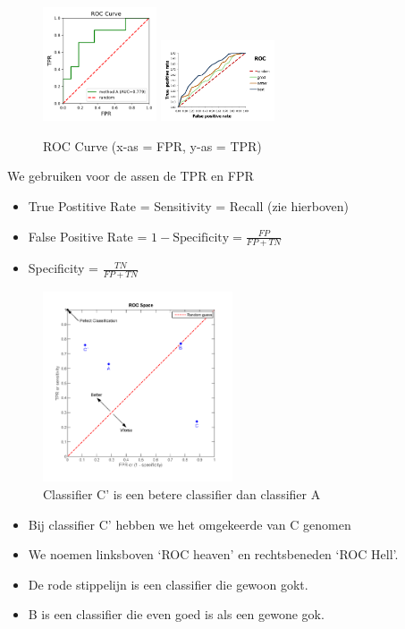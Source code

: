 \documentclass{article}
\begin{document}
\begin{figure}[H]
    \centering
    \includegraphics[width=0.3\textwidth]{roc.png}
    \includegraphics[width=0.3\textwidth]{roc2.png}
    \caption{ROC Curve (x-as = FPR, y-as = TPR)}
\end{figure}

We gebruiken voor de assen de TPR en FPR

\begin{itemize}
    \item True Postitive Rate = Sensitivity = Recall (zie hierboven)
    \item False Positive Rate = $1 - \text{Specificity} = \frac{FP}{FP + TN}$
    \item Specificity = $\frac{TN}{FP + TN}$
\end{itemize}

\begin{figure}[H]
    \centering
    \includegraphics[width=0.5\textwidth]{roc3.png}
    \caption{Classifier C' is een betere classifier dan classifier A}
\end{figure}

\begin{itemize}
    \item Bij classifier C' hebben we het omgekeerde van C genomen
    \item We noemen linksboven `ROC heaven' en rechtsbeneden `ROC Hell'.
    \item De rode stippelijn is een classifier die gewoon gokt.
    \item B is een classifier die even goed is als een gewone gok.
\end{itemize}
\end{document}
